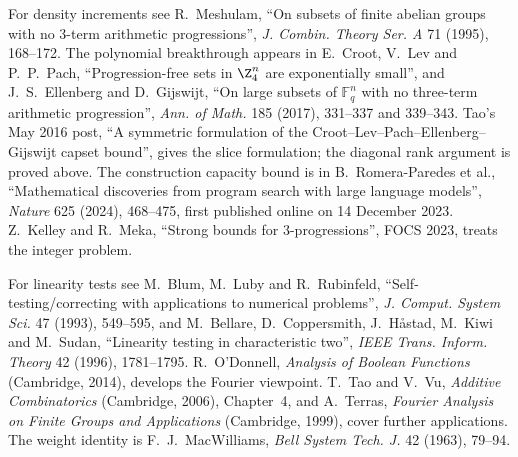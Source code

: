 For density increments see R.~Meshulam, ``On subsets of finite abelian groups with no 3-term arithmetic progressions'', \emph{J. Combin. Theory Ser. A} 71 (1995), 168--172. The polynomial breakthrough appears in E.~Croot, V.~Lev and P.~P.~Pach, ``Progression-free sets in $\Z_4^n$ are exponentially small'', and J.~S.~Ellenberg and D.~Gijswijt, ``On large subsets of $\mathbb F_q^n$ with no three-term arithmetic progression'', \emph{Ann. of Math.} 185 (2017), 331--337 and 339--343. Tao's May 2016 post, ``A symmetric formulation of the Croot--Lev--Pach--Ellenberg--Gijswijt capset bound'', gives the slice formulation; the diagonal rank argument is proved above. The construction capacity bound is in B.~Romera-Paredes et al., ``Mathematical discoveries from program search with large language models'', \emph{Nature} 625 (2024), 468--475, first published online on 14 December 2023. Z.~Kelley and R.~Meka, ``Strong bounds for 3-progressions'', FOCS 2023, treats the integer problem.

For linearity tests see M.~Blum, M.~Luby and R.~Rubinfeld, ``Self-testing/correcting with applications to numerical problems'', \emph{J. Comput. System Sci.} 47 (1993), 549--595, and M.~Bellare, D.~Coppersmith, J.~H\aa stad, M.~Kiwi and M.~Sudan, ``Linearity testing in characteristic two'', \emph{IEEE Trans. Inform. Theory} 42 (1996), 1781--1795. R.~O'Donnell, \emph{Analysis of Boolean Functions} (Cambridge, 2014), develops the Fourier viewpoint. T.~Tao and V.~Vu, \emph{Additive Combinatorics} (Cambridge, 2006), Chapter~4, and A.~Terras, \emph{Fourier Analysis on Finite Groups and Applications} (Cambridge, 1999), cover further applications. The weight identity is F.~J.~MacWilliams, \emph{Bell System Tech. J.} 42 (1963), 79--94.
